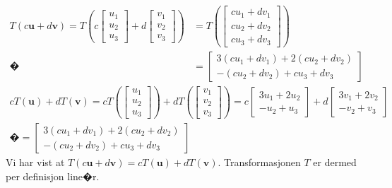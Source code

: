 \documentclass[a4paper, norsk, 12pt]{extarticle}
\begin{document}
\begin{itemize}
\begin{align*}
T(c \boldsymbol{u} + d \boldsymbol{v})
= T\left(c \begin{bmatrix} u_1 \\ u_2 \\ u_3 \end{bmatrix} + d \begin{bmatrix} v_1 \\ v_2 \\ v_3 \end{bmatrix}\right)
&= T\left(\begin{bmatrix} cu_1 + dv_1 \\ cu_2 + dv_2 \\ cu_3 + dv_3 \end{bmatrix} \right) \\�
&= \begin{bmatrix} 3(cu_1 + dv_1) + 2(cu_2 + dv_2)  \\ -(cu_2 + dv_2) + cu_3 + dv_3\end{bmatrix}
\end{align*}
\begin{align*}
cT( \boldsymbol{u}) +  d T(\boldsymbol{v}) = c T\left(\begin{bmatrix} u_1 \\ u_2 \\ u_3 \end{bmatrix} \right) + d T\left(\begin{bmatrix} v_1 \\ v_2 \\ v_3 \end{bmatrix}\right)
= c \begin{bmatrix} 3u_1 + 2u_2 \\ -u_2 + u_3 \end{bmatrix} + d \begin{bmatrix} 3v_1 + 2v_2 \\ -v_2 + v_3 \end{bmatrix} \\�= \begin{bmatrix} 3(cu_1 + dv_1) + 2(cu_2 + dv_2)  \\ -(cu_2 + dv_2) + cu_3 + dv_3\end{bmatrix}
\end{align*}
Vi har vist at $T(c \boldsymbol{u} + d \boldsymbol{v}) = cT( \boldsymbol{u}) +  d T(\boldsymbol{v})$. Transformasjonen $T$ er dermed per definisjon line�r.


\end{itemize}
\end{document}

